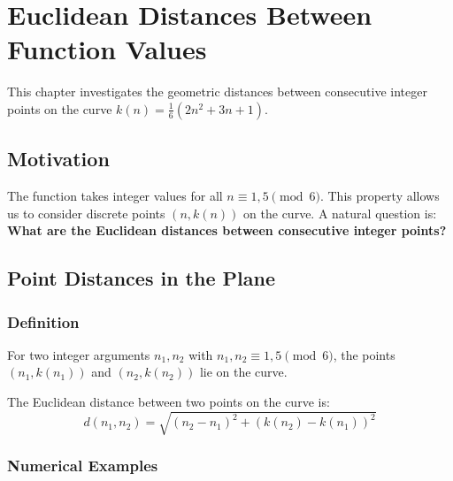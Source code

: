 \chapter{Euclidean Distances Between Function Values}

This chapter investigates the geometric distances between consecutive
integer points on the curve $k(n) = \frac{1}{6}(2n^2 + 3n + 1)$.

\section{Motivation}

The function takes integer values for all $n \equiv 1, 5 \pmod{6}$. This
property allows us to consider discrete points $(n, k(n))$ on the curve.
A natural question is: \textbf{What are the Euclidean distances between
consecutive integer points?}

\section{Point Distances in the Plane}

\subsection{Definition}

For two integer arguments $n_1, n_2$ with $n_1, n_2 \equiv 1, 5 \pmod{6}$,
the points $(n_1, k(n_1))$ and $(n_2, k(n_2))$ lie on the curve.

\begin{definition}
The Euclidean distance between two points on the curve is:
\begin{equation}
d(n_1, n_2) = \sqrt{(n_2 - n_1)^2 + (k(n_2) - k(n_1))^2}
\end{equation}
\end{definition}

\subsection{Numerical Examples}

